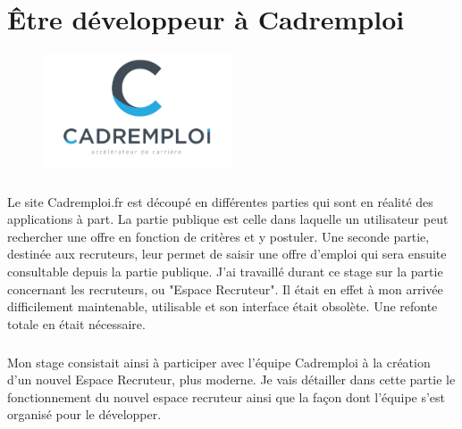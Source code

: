 
\chapter{Être développeur à Cadremploi} %

\label{apports} %


\begin{figure}[h]
  \begin{center}
    \hspace*{-1in}
    \includegraphics[width=0.5\textwidth]{Pictures/CE_logo.png}
  \end{center}
\end{figure}
\paragraph{}
Le site Cadremploi.fr est découpé en différentes parties qui sont en réalité des applications à part.
La partie publique est celle dans laquelle un utilisateur peut rechercher une offre en fonction de critères et y postuler.
Une seconde partie, destinée aux recruteurs, leur permet de saisir une offre d'emploi qui sera ensuite consultable depuis la partie publique.
J'ai travaillé durant ce stage sur la partie concernant les recruteurs, ou "Espace Recruteur".
Il était en effet à mon arrivée difficilement maintenable, utilisable et son interface était obsolète.
Une refonte totale en était nécessaire.
\paragraph{}
Mon stage consistait ainsi à participer avec l'équipe Cadremploi à la création d'un nouvel Espace Recruteur, plus moderne.
Je vais détailler dans cette partie le fonctionnement du nouvel espace recruteur ainsi que la façon dont l'équipe s'est organisé pour le développer.


